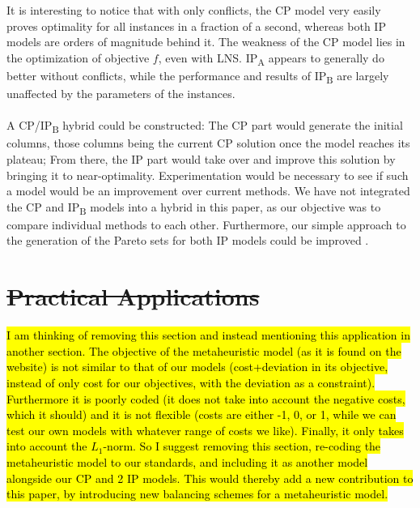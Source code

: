 \documentclass{llncs}
\begin{document}
It is interesting to notice that with only conflicts, the CP model very easily proves optimality for all instances in a fraction of a second, whereas both IP models are orders of magnitude behind it. The weakness of the CP model lies in the optimization of objective $f$, even with LNS. IP\textsubscript{A} appears to generally do better without conflicts, while the performance and results of IP\textsubscript{B} are largely unaffected by the parameters of the instances.

\paragraph{}A CP/IP\textsubscript{B} hybrid could be constructed: The CP part would generate the initial columns, those columns being the current CP solution once the model reaches its plateau; From there, the IP part would take over and improve this solution by bringing it to near-optimality. Experimentation would be necessary to see if such a model would be an improvement over current methods. We have not integrated the CP and IP\textsubscript{B} models into a hybrid in this paper, as our objective was to compare individual methods to each other. Furthermore, our simple approach to the generation of the Pareto sets for both IP models could be improved \cite{Boland2015}.



\section{\st{Practical Applications}}
\hl{I am thinking of removing this section and instead mentioning this application in another section. The objective of the metaheuristic model (as it is found on the website) is not similar to that of our models (cost+deviation in its objective, instead of only cost for our objectives, with the deviation as a constraint). Furthermore it is poorly coded (it does not take into account the negative costs, which it should) and it is not flexible (costs are either -1, 0, or 1, while we can test our own models with whatever range of costs we like). Finally, it only takes into account the $L_1$-norm. So I suggest removing this section, re-coding the metaheuristic model to our standards, and including it as another model alongside our CP and 2 IP models. This would thereby add a new contribution to this paper, by introducing new balancing schemes for a metaheuristic model.}
\end{document}
